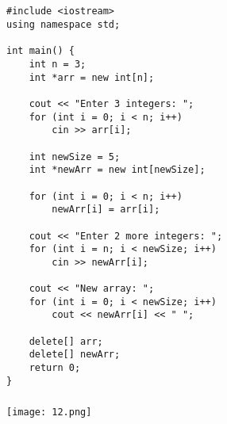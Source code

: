 \documentclass[12pt,a4paper]{article}
\begin{document}
\subsection{}
\begin{lstlisting}
#include <iostream>
using namespace std;

int main() {
    int n = 3;
    int *arr = new int[n];

    cout << "Enter 3 integers: ";
    for (int i = 0; i < n; i++)
        cin >> arr[i];

    int newSize = 5;
    int *newArr = new int[newSize];

    for (int i = 0; i < n; i++)
        newArr[i] = arr[i];

    cout << "Enter 2 more integers: ";
    for (int i = n; i < newSize; i++)
        cin >> newArr[i];

    cout << "New array: ";
    for (int i = 0; i < newSize; i++)
        cout << newArr[i] << " ";

    delete[] arr;
    delete[] newArr;
    return 0;
}

\end{lstlisting}

\subsubsection{}
\begin{center}
    \texttt{[image: 12.png]}
\end{center}
\end{document}
